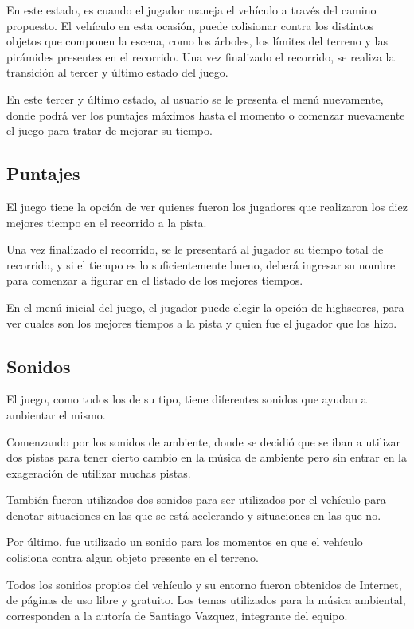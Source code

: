 \documentclass[a4paper,10pt]{article}
\begin{document}
En este estado, es cuando el jugador maneja el vehículo a través del camino
propuesto.  El vehículo en esta ocasión, puede colisionar contra los distintos
objetos que componen la escena, como los árboles, los límites del terreno y las
pirámides presentes en el recorrido.  Una vez finalizado el recorrido, se
realiza la transición al tercer y último estado del juego.

En este tercer y último estado, al usuario se le presenta el menú nuevamente,
donde podrá ver los puntajes máximos hasta el momento o comenzar nuevamente el
juego para tratar de mejorar su tiempo.

\subsection{Puntajes}
El juego tiene la opción de ver quienes fueron los jugadores que realizaron los
diez mejores tiempo en el recorrido a la pista.

Una vez finalizado el recorrido, se le presentará al jugador su tiempo total de
recorrido, y si el tiempo es lo suficientemente bueno, deberá ingresar su
nombre para comenzar a figurar en el listado de los mejores tiempos.

En el menú inicial del juego, el jugador puede elegir la opción de highscores,
para ver cuales son los mejores tiempos a la pista y quien fue el jugador que
los hizo.
\subsection{Sonidos}
El juego, como todos los de su tipo, tiene diferentes sonidos que ayudan a
ambientar el mismo.

Comenzando por los sonidos de ambiente, donde se decidió que se iban a utilizar
dos pistas para tener cierto cambio en la música de ambiente pero sin entrar en
la exageración de utilizar muchas pistas.

También fueron utilizados dos sonidos para ser utilizados por el vehículo para
denotar situaciones en las que se está acelerando y situaciones en las que no.

Por último, fue utilizado un sonido para los momentos en que el vehículo
colisiona contra algun objeto presente en el terreno.

Todos los sonidos propios del vehículo y su entorno fueron obtenidos de
Internet, de páginas de uso libre y gratuito.  Los temas utilizados para la
música ambiental, corresponden a la autoría de Santiago Vazquez, integrante del
equipo.
\end{document}
